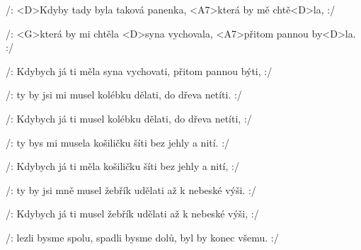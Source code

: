

\zs
/: <D>Kdyby tady byla taková panenka,
<A7>která by mě chtě<D>la, :/

/: <G>která by mi chtěla <D>syna vychovala,
<A7>přitom pannou by<D>la. :/
\ks

\zs
/: Kdybych já ti měla syna vychovati, přitom pannou býti, :/

/: ty by jsi mi musel kolébku dělati, do dřeva netíti. :/
\ks

\zs
/: Kdybych já ti musel kolébku dělati, do dřeva netíti, :/

/: ty bys mi musela košiličku šíti bez jehly a nití. :/
\ks

\zs
/: Kdybych já ti měla košiličku šíti bez jehly a nití, :/

/: ty by jsi mně musel žebřík udělati až k nebeské výši. :/
\ks

\zs
/: Kdybych já ti musel žebřík udělati až k nebeské výši, :/

/: lezli bysme spolu, spadli bysme dolů, byl by konec všemu. :/
\ks

\kp
